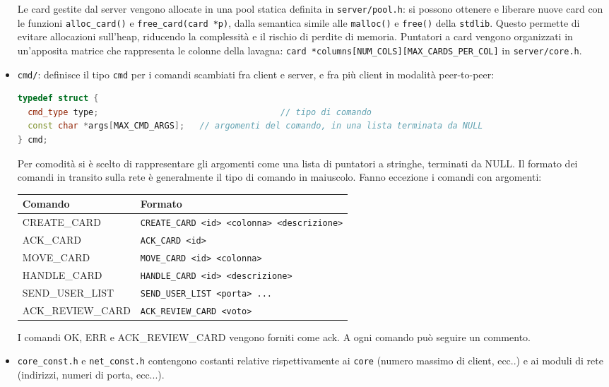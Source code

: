 \documentclass[9pt,a4paper]{article}
\begin{document}
\begin{itemize}
Le card gestite dal server vengono allocate in una pool statica definita in \lstinline|server/pool.h|: si possono ottenere e liberare nuove card con le funzioni \lstinline|alloc_card()| e \lstinline|free_card(card *p)|, dalla semantica simile alle \lstinline|malloc()| e \lstinline|free()| della \lstinline|stdlib|. Questo permette di evitare allocazioni sull'heap, riducendo la complessità e il rischio di perdite di memoria.
Puntatori a card vengono organizzati in un'apposita matrice che rappresenta le colonne della lavagna: \lstinline|card *columns[NUM_COLS][MAX_CARDS_PER_COL]| in \lstinline|server/core.h|.
	\item \lstinline|cmd/|: definisce il tipo \lstinline|cmd| per i comandi scambiati fra client e server, e fra più client in modalità peer-to-peer:
\begin{lstlisting}[language=C++]	
typedef struct {
  cmd_type type;									// tipo di comando
  const char *args[MAX_CMD_ARGS];	// argomenti del comando, in una lista terminata da NULL
} cmd;
\end{lstlisting}
Per comodità si è scelto di rappresentare gli argomenti come una lista di puntatori a stringhe, terminati da NULL.
Il formato dei comandi in transito sulla rete è generalmente il tipo di comando in maiuscolo. Fanno eccezione i comandi con argomenti:
\vspace{-10pt}
\begin{table}[H]
	\center
	\begin{tabular} { p{5cm} | p{10cm} }
		\bfseries Comando & \bfseries Formato \\
		\hline
		CREATE\_CARD & \lstinline|CREATE_CARD <id> <colonna> <descrizione>| \\
		ACK\_CARD & \lstinline|ACK_CARD <id>| \\
		MOVE\_CARD & \lstinline|MOVE_CARD <id> <colonna>| \\
		HANDLE\_CARD & \lstinline|HANDLE_CARD <id> <descrizione>| \\ 
		SEND\_USER\_LIST & \lstinline|SEND_USER_LIST <porta> ...| \\
		ACK\_REVIEW\_CARD & \lstinline|ACK_REVIEW_CARD <voto>|
	\end{tabular}
\end{table}
\vspace{-10pt}
I comandi OK, ERR e ACK\_REVIEW\_CARD vengono forniti come ack. A ogni comando può seguire un commento.

	\item \lstinline|core_const.h| e \lstinline|net_const.h| contengono costanti relative rispettivamente ai \lstinline|core| (numero massimo di client, ecc..) e ai moduli di rete (indirizzi, numeri di porta, ecc...).
\end{itemize}
\end{document}
